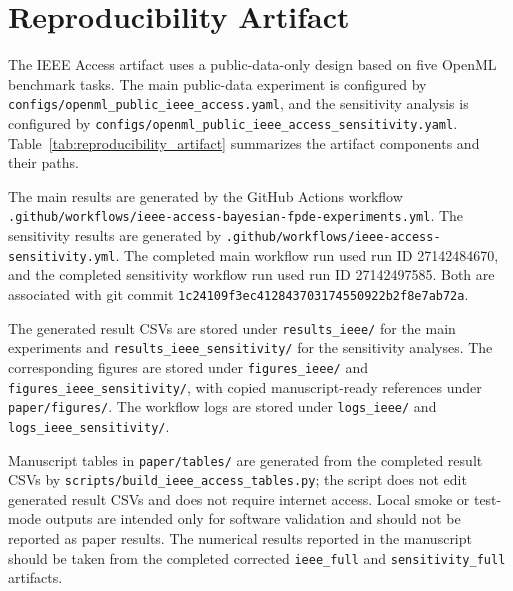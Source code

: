 \section{Reproducibility Artifact}

The IEEE Access artifact uses a public-data-only design based on five OpenML benchmark tasks. The main public-data experiment is configured by \texttt{configs/openml\_public\_ieee\_access.yaml}, and the sensitivity analysis is configured by \texttt{configs/openml\_public\_ieee\_access\_sensitivity.yaml}. Table~\ref{tab:reproducibility_artifact} summarizes the artifact components and their paths.

The main results are generated by the GitHub Actions workflow \texttt{.github/workflows/ieee-access-bayesian-fpde-experiments.yml}. The sensitivity results are generated by \texttt{.github/workflows/ieee-access-sensitivity.yml}. The completed main workflow run used run ID 27142484670, and the completed sensitivity workflow run used run ID 27142497585. Both are associated with git commit \texttt{1c24109f3ec412843703174550922b2f8e7ab72a}.

The generated result CSVs are stored under \texttt{results\_ieee/} for the main experiments and \texttt{results\_ieee\_sensitivity/} for the sensitivity analyses. The corresponding figures are stored under \texttt{figures\_ieee/} and \texttt{figures\_ieee\_sensitivity/}, with copied manuscript-ready references under \texttt{paper/figures/}. The workflow logs are stored under \texttt{logs\_ieee/} and \texttt{logs\_ieee\_sensitivity/}.

Manuscript tables in \texttt{paper/tables/} are generated from the completed result CSVs by \texttt{scripts/build\_ieee\_access\_tables.py}; the script does not edit generated result CSVs and does not require internet access. Local smoke or test-mode outputs are intended only for software validation and should not be reported as paper results. The numerical results reported in the manuscript should be taken from the completed corrected \texttt{ieee\_full} and \texttt{sensitivity\_full} artifacts.
